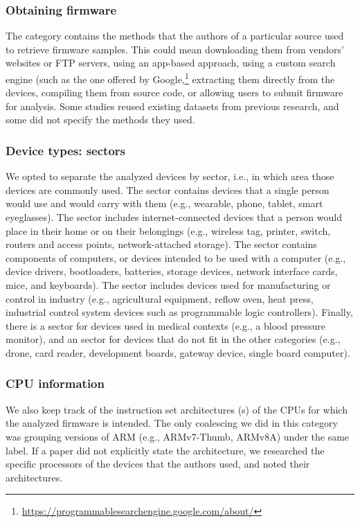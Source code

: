 \subsubsection{Obtaining firmware}
The  category contains the methods that the authors of a particular source used to retrieve firmware samples.
This could mean downloading them from vendors' websites or FTP servers, using an app-based approach, using a custom search engine (such as the one offered by Google,\footnote{\url{https://programmablesearchengine.google.com/about/}} extracting them directly from the devices, compiling them from source code, or allowing users to submit firmware for analysis.
Some studies reused existing datasets from previous research, and some did not specify the methods they used.

\subsubsection{Device types: sectors}
We opted to separate the analyzed devices by sector, i.e., in which area those devices are commonly used.
The  sector contains devices that a single person would use and would carry with them (e.g., wearable, phone, tablet, smart eyeglasses).
The  sector includes internet-connected devices that a person would place in their home or on their belongings (e.g., wireless tag, printer, switch, routers and access points, network-attached storage).
The  sector contains components of computers, or devices intended to be used with a computer (e.g., device drivers, bootloaders, batteries, storage devices, network interface cards, mice, and keyboards).
The  sector includes devices used for manufacturing or control in industry (e.g., agricultural equipment, reflow oven, heat press, industrial control system devices such as programmable logic controllers).
Finally, there is a  sector for devices used in medical contexts (e.g., a blood pressure monitor), and an  sector for devices that do not fit in the other categories (e.g., drone, card reader, development boards, gateway device, single board computer).

\subsubsection{CPU information}
We also keep track of the instruction set architectures (s) of the CPUs for which the analyzed firmware is intended.
The only coalescing we did in this category was grouping versions of ARM (e.g., ARMv7-Thumb, ARMv8A) under the same  label.
If a paper did not explicitly state the architecture, we researched the specific processors of the devices that the authors used, and noted their architectures.

